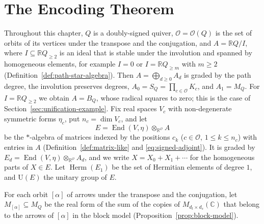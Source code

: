 \documentclass[12pt, a4paper]{report}
\theoremstyle{plain}
\theoremstyle{definition}
\theoremstyle{remark}
\theoremstyle{plain}
\newcommand{\RR}{\mathbb{R}}
\newcommand{\CC}{\mathbb{C}}
\newcommand{\Un}{\mathrm{U}}
\newcommand{\Herm}{\operatorname{Herm}}
\DeclareMathOperator{\End}{End}
\begin{document}
\section{The Encoding Theorem}
\label{sec:encoding}
Throughout this chapter, $Q$ is a doubly-signed quiver, $\mathcal O=\mathcal O(Q)$ is the set of orbits of its vertices under the transpose and the conjugation, and $A=\RR Q/I$, where $I\subseteq\RR Q_{\geq2}$ is an ideal that is stable under the involution and spanned by homogeneous elements, for example $I=0$ or $I=\RR Q_{\geq m}$ with $m\geq2$ (Definition~\ref{def:path-star-algebra}). Then $A=\bigoplus_{d\geq0}A_d$ is graded by the path degree, the involution preserves degrees, $A_0=S_Q=\prod_{c\in\mathcal O}K_c$, and $A_1=M_Q$. For $I=\RR Q_{\geq2}$ we obtain $A=B_Q$, whose radical squares to zero; this is the case of Section~\ref{sec:unification-example}. Fix real spaces $V_c$ with non-degenerate symmetric forms $\eta_c$, put $n_c=\dim V_c$, and let
\[ E=\End(V,\eta)\otimes_{\RR^{\mathcal O}}A \]
be the $*$-algebra of matrices indexed by the positions $c_k$ ($c\in\mathcal O$, $1\leq k\leq n_c$) with entries in $A$ (Definition~\ref{def:matrix-like} and \eqref{eq:signed-adjoint}). It is graded by $E_d=\End(V,\eta)\otimes_{\RR^{\mathcal O}}A_d$, and we write $X=X_0+X_1+\cdots$ for the homogeneous parts of $X\in E$. Let $\Herm(E_1)$ be the set of Hermitian elements of degree $1$, and $\Un(E)$ the unitary group of $E$.

For each orbit $[\alpha]$ of arrows under the transpose and the conjugation, let $M_{[\alpha]}\subseteq M_Q$ be the real form of the sum of the copies of $M_{d_t\times d_s}(\CC)$ that belong to the arrows of $[\alpha]$ in the block model (Proposition~\ref{prop:block-model}).
\end{document}
